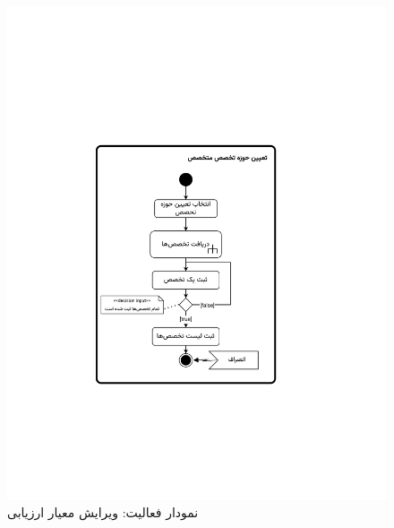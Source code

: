 \begin{figure}[ht!]
	\centering
	\includegraphics[scale=0.8, page=10]{figs/OOD-activity21-30.pdf}
	\caption{نمودار فعالیت: ویرایش معیار ارزیابی}
\end{figure}
\FloatBarrier
\newpage

